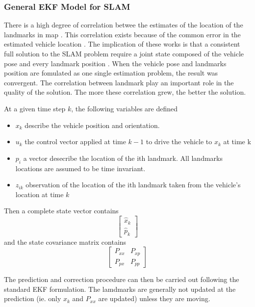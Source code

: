 \subsubsection{General EKF Model for SLAM}
There is a high degree of correlation betwee the estimates of the
location of the landmarks in map \cite{smith_representation_1986}
\cite{durrant-whyte_uncertain_1988}. This correlation exists because
of the common error in the estimated vehicle location
\cite{leonard_simultaneous_1991}. The implication of these works is
that a consistent full solution to the SLAM problem require a joint
state composed of the vehicle pose and every landmark position
\cite{durrant-whyte_simultaneous_2006}. When the vehicle pose and
landmarks position are fomulated as one single estimation problem, the
result was convergent. The correlation between landmark play an
important role in the quality of the solution. The more these
correlation grew, the better the solution.
\cite{durrant-whyte_localization_1996} \cite{csorba_new_1996}
\cite{csorba_simultaneous_1997} \cite{dissanayake_solution_2001}

At a given time step $k$, the following variables are defined
\begin{itemize}
  \item $x_k$ describe the vehicle position and orientation.
  \item $u_k$ the control vector applied at time $k-1$ to drive the
  vehicle to $x_k$ at time k
  \item $p_i$ a vector desecribe the location of the ith landmark. All
  landmarks locations are assumed to be time invariant.  
  \item $z_{ik}$ observation of the location of the ith landmark taken
  from the vehicle's location at time $k$
\end{itemize}

Then a complete state vector contains
$$\begin{bmatrix}\hat{x}_k \\ \hat{p}_k \end{bmatrix}$$
\noindent and the state covariance matrix contains
$$\begin{bmatrix}
P_{xx} & P_{xp} \\
P_{px} & P_{pp} 
\end{bmatrix} $$

The prediction and correction procedure can then be carried out
following the standard EKF formulation. The lamdmarks are generally
not updated at the prediction (ie. only $x_k$ and $P_{xx}$ are
updated) unless they are moving.


